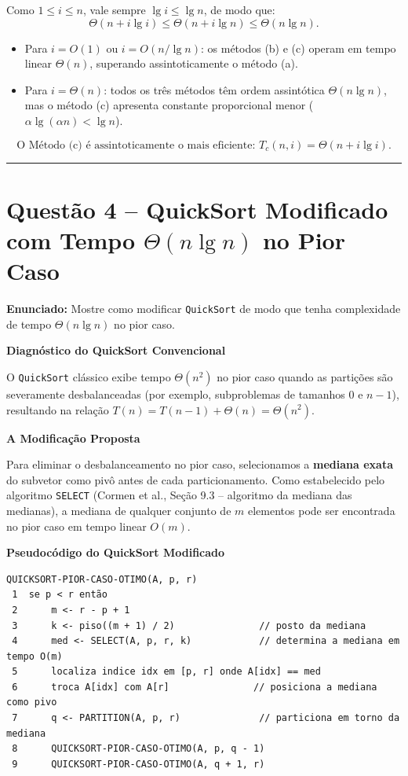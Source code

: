 \documentclass[11pt,a4paper]{article}
\newcommand{\res}[1]{\[\boxed{#1}\]}
\newcommand{\topico}[1]{\par\medskip\textbf{\color{azul}#1}\par}
\newcommand{\questao}[2]{\section*{Questão #1 -- #2}}
\begin{document}
Como $1 \le i \le n$, vale sempre $\lg i \le \lg n$, de modo que:
\[
\Theta(n + i \lg i) \le \Theta(n + i \lg n) \le \Theta(n \lg n).
\]
\begin{itemize}
    \item Para $i = O(1)$ ou $i = O(n/\lg n)$: os métodos (b) e (c) operam em tempo linear $\Theta(n)$, superando assintoticamente o método (a).
    \item Para $i = \Theta(n)$: todos os três métodos têm ordem assintótica $\Theta(n \lg n)$, mas o método (c) apresenta constante proporcional menor ($\alpha \lg(\alpha n) < \lg n$).
\end{itemize}
\res{\text{O Método (c) é assintoticamente o mais eficiente: } T_c(n, i) = \Theta(n + i \lg i).}

\vspace{12pt}
\hrule
\vspace{6pt}
\questao{4}{QuickSort Modificado com Tempo $\Theta(n \lg n)$ no Pior Caso}

\textbf{Enunciado:} Mostre como modificar \texttt{QuickSort} de modo que tenha complexidade de tempo $\Theta(n \lg n)$ no pior caso.

\topico{Diagnóstico do QuickSort Convencional}
O \texttt{QuickSort} clássico exibe tempo $\Theta(n^2)$ no pior caso quando as partições são severamente desbalanceadas (por exemplo, subproblemas de tamanhos $0$ e $n-1$), resultando na relação $T(n) = T(n-1) + \Theta(n) = \Theta(n^2)$.

\topico{A Modificação Proposta}
Para eliminar o desbalanceamento no pior caso, selecionamos a \textbf{mediana exata} do subvetor como pivô antes de cada particionamento. 
Como estabelecido pelo algoritmo \texttt{SELECT} (Cormen et al., Seção 9.3 -- algoritmo da mediana das medianas), a mediana de qualquer conjunto de $m$ elementos pode ser encontrada no pior caso em tempo linear $O(m)$.

\topico{Pseudocódigo do QuickSort Modificado}
\begin{lstlisting}
QUICKSORT-PIOR-CASO-OTIMO(A, p, r)
 1  se p < r então
 2      m <- r - p + 1
 3      k <- piso((m + 1) / 2)               // posto da mediana
 4      med <- SELECT(A, p, r, k)            // determina a mediana em tempo O(m)
 5      localiza indice idx em [p, r] onde A[idx] == med
 6      troca A[idx] com A[r]               // posiciona a mediana como pivo
 7      q <- PARTITION(A, p, r)              // particiona em torno da mediana
 8      QUICKSORT-PIOR-CASO-OTIMO(A, p, q - 1)
 9      QUICKSORT-PIOR-CASO-OTIMO(A, q + 1, r)
\end{lstlisting}
\end{document}
